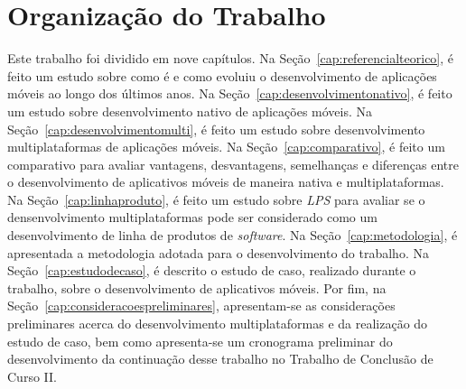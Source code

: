 \section{Organização do Trabalho}\label{sec:organizacao}

Este trabalho foi dividido em nove capítulos. %
Na Seção~\ref{cap:referencialteorico}, é feito um estudo sobre como é e como evoluiu o desenvolvimento de aplicações móveis ao longo dos últimos anos. 
Na Seção~\ref{cap:desenvolvimentonativo}, é feito um estudo sobre desenvolvimento nativo de aplicações móveis.
Na Seção~\ref{cap:desenvolvimentomulti}, é feito um estudo sobre desenvolvimento multiplataformas de aplicações móveis.
Na Seção~\ref{cap:comparativo}, é feito um comparativo para avaliar vantagens, desvantagens, semelhanças e diferenças entre o desenvolvimento de aplicativos móveis de maneira nativa e multiplataformas.  
Na Seção~\ref{cap:linhaproduto}, é feito um estudo sobre \textit{LPS} para avaliar se o densenvolvimento multiplataformas pode ser considerado como um desenvolvimento de linha de produtos de \textit{software}.
Na Seção~\ref{cap:metodologia}, é apresentada a metodologia adotada para o desenvolvimento do trabalho.  
Na Seção~\ref{cap:estudodecaso}, é descrito o estudo de caso, realizado durante o trabalho, sobre o desenvolvimento de aplicativos móveis.
Por fim, na Seção~\ref{cap:consideracoespreliminares}, apresentam-se as considerações preliminares acerca do desenvolvimento multiplataformas e da realização do estudo de caso, bem como apresenta-se um 
cronograma preliminar do desenvolvimento da continuação desse trabalho no Trabalho de Conclusão de Curso II. 